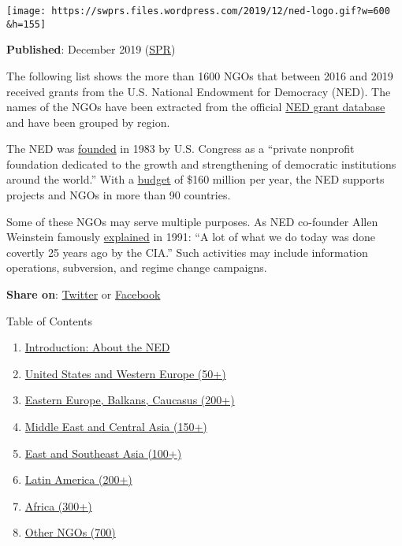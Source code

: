 \texttt{[image: https://swprs.files.wordpress.com/2019/12/ned-logo.gif?w=600\\\&h=155]}

\textbf{Published}: December 2019
(\href{https://swprs.org/contact/}{SPR})

The following list shows the more than 1600 NGOs that between 2016 and
2019 received grants from the U.S. National Endowment for Democracy
(NED). The names of the NGOs have been extracted from the official
\href{https://www.ned.org/wp-content/themes/ned/search/grant-search.php}{NED
grant database} and have been grouped by region.

The NED was \href{https://www.ned.org/}{founded} in 1983 by U.S.
Congress as a ``private nonprofit foundation dedicated to the growth and
strengthening of democratic institutions around the world.'' With a
\href{https://www.newsweek.com/state-department-democracy-promotion-funding-rex-tillerson-830858}{budget}
of \$160 million per year, the NED supports projects and NGOs in more
than 90 countries.

Some of these NGOs may serve multiple purposes. As NED co-founder Allen
Weinstein famously
\href{https://www.washingtonpost.com/archive/opinions/1991/09/22/innocence-abroad-the-new-world-of-spyless-coups/92bb989a-de6e-4bb8-99b9-462c76b59a16/}{explained}
in 1991: ``A lot of what we do today was done covertly 25 years ago by
the CIA.'' Such activities may include information operations,
subversion, and regime change campaigns.

\textbf{Share on}:
\href{https://twitter.com/intent/tweet?url=https://swprs.org/organizations-funded-by-the-ned/}{Twitter}
or
\href{https://www.facebook.com/share.php?u=https://swprs.org/organizations-funded-by-the-ned/}{Facebook}

Table of Contents

\begin{enumerate}
\def\labelenumi{\arabic{enumi}.}
\tightlist
\item
  \protect\hyperlink{articles}{Introduction: About the NED}
\item
  \protect\hyperlink{us-eu}{United States and Western Europe (50+)}
\item
  \protect\hyperlink{eastern-europe}{Eastern Europe, Balkans, Caucasus
  (200+)}
\item
  \protect\hyperlink{middle-east}{Middle East and Central Asia (150+)}
\item
  \protect\hyperlink{asia}{East and Southeast Asia (100+)}
\item
  \protect\hyperlink{latin-america}{Latin America (200+)}
\item
  \protect\hyperlink{africa}{Africa (300+)}
\item
  \protect\hyperlink{other}{Other NGOs (700)}
\end{enumerate}

